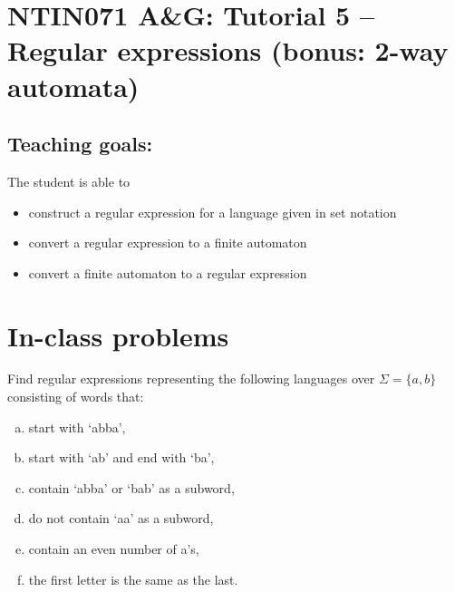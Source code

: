 \documentclass[a4paper,12pt]{amsart}
\begin{document}
\thispagestyle{empty}

\section*{NTIN071 A\&G: Tutorial 5 -- Regular expressions (bonus: 2-way automata)}

\medskip

\subsection*{Teaching goals:} The student is able to

    \begin{itemize}\setlength{\itemsep}{0pt}
        \item construct a regular expression for a language given in set notation
        \item convert a regular expression to a finite automaton
        \item convert a finite automaton to a regular expression
    \end{itemize}


\section*{In-class problems}


\medskip\begin{problem}

    Find regular expressions representing the following languages over $\Sigma = \{a, b\}$ consisting of words that:

    \begin{multicols}{2}

        \begin{enumerate}[(a)]\setlength\itemsep{0pt}
            \item start with `abba',
            \item start with `ab' and end with `ba',
            \item contain `abba' or `bab' as a subword,
            \item do not contain `aa' as a subword,
            \item contain an even number of a's,
            \item the first letter is the same as the last.
        \end{enumerate}

    \end{multicols}

\end{problem}
\end{document}
